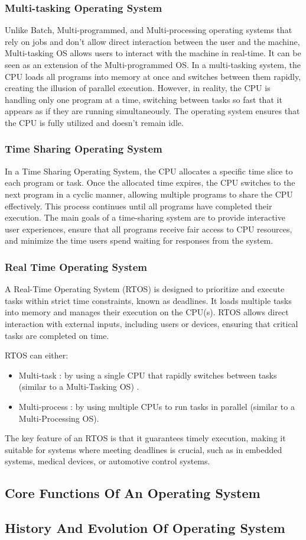 \subsubsection{Multi-tasking Operating System}
Unlike Batch, Multi-programmed, and Multi-processing operating systems that rely on jobs and don't allow direct interaction between the user and the machine, Multi-tasking OS allows 
users to interact with the machine in real-time. It can be seen as an extension of the Multi-programmed OS. In a multi-tasking system, the CPU loads all programs into memory at once and 
switches between them rapidly, creating the illusion of parallel execution. However, in reality, the CPU is handling only one program at a time, switching between tasks so fast that it appears 
as if they are running simultaneously. The operating system ensures that the CPU is fully utilized and doesn’t remain idle.
\subsubsection{Time Sharing Operating System}
In a Time Sharing Operating System, the CPU allocates a specific time slice to each program or task. Once the allocated time expires, the CPU switches to the next program in a cyclic manner,
allowing multiple programs to share the CPU effectively. This process continues until all programs have completed their execution.
The main goals of a time-sharing system are to provide interactive user experiences, ensure that all programs receive fair access to CPU resources, and minimize the time users spend waiting 
for responses from the system.
\subsubsection{Real Time Operating System}
A Real-Time Operating System (RTOS) is designed to prioritize and execute tasks within strict time constraints, known as deadlines. It loads multiple tasks into memory and manages their execution
on the CPU(s). RTOS allows direct interaction with external inputs, including users or devices, ensuring that critical tasks are completed on time.

RTOS can either:
\begin{itemize}
    \item Multi-task :  by using a single CPU that rapidly switches between tasks (similar to a Multi-Tasking OS) .
    \item Multi-process : by using multiple CPUs to run tasks in parallel (similar to a Multi-Processing OS).
\end{itemize}

The key feature of an RTOS is that it guarantees timely execution, making it suitable for systems where meeting deadlines is crucial, such as in embedded systems, medical devices, or automotive 
control systems.
\subsection{Core Functions Of An Operating System}
\subsection{History And Evolution Of Operating System}
